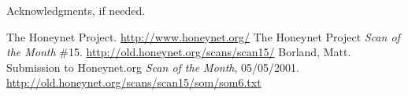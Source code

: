 \documentclass[nocopyrightspace]{sigplanconf}
\begin{document}
\acks

Acknowledgments, if needed.





\begin{thebibliography}{}
\softraggedright

The Honeynet Project. \url{http://www.honeynet.org/}
The Honeynet Project \emph{Scan of the Month} \#15.
\url{http://old.honeynet.org/scans/scan15/}
Borland, Matt. Submission to Honeynet.org \emph{Scan of the Month},
05/05/2001. \url{http://old.honeynet.org/scans/scan15/som/som6.txt}

\end{thebibliography}
\end{document}
